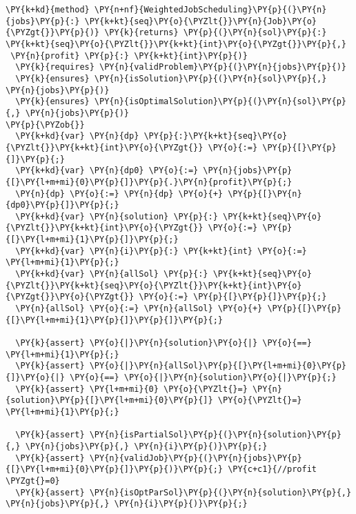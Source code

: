 \begin{Verbatim}[commandchars=\\\{\}, fontsize=\small]
\PY{k+kd}{method} \PY{n+nf}{WeightedJobScheduling}\PY{p}{(}\PY{n}{jobs}\PY{p}{:} \PY{k+kt}{seq}\PY{o}{\PYZlt{}}\PY{n}{Job}\PY{o}{\PYZgt{}}\PY{p}{)} \PY{k}{returns} \PY{p}{(}\PY{n}{sol}\PY{p}{:} \PY{k+kt}{seq}\PY{o}{\PYZlt{}}\PY{k+kt}{int}\PY{o}{\PYZgt{}}\PY{p}{,}
 \PY{n}{profit} \PY{p}{:} \PY{k+kt}{int}\PY{p}{)}
  \PY{k}{requires} \PY{n}{validProblem}\PY{p}{(}\PY{n}{jobs}\PY{p}{)}
  \PY{k}{ensures} \PY{n}{isSolution}\PY{p}{(}\PY{n}{sol}\PY{p}{,} \PY{n}{jobs}\PY{p}{)}
  \PY{k}{ensures} \PY{n}{isOptimalSolution}\PY{p}{(}\PY{n}{sol}\PY{p}{,} \PY{n}{jobs}\PY{p}{)}
\PY{p}{\PYZob{}}
  \PY{k+kd}{var} \PY{n}{dp} \PY{p}{:}\PY{k+kt}{seq}\PY{o}{\PYZlt{}}\PY{k+kt}{int}\PY{o}{\PYZgt{}} \PY{o}{:=} \PY{p}{[}\PY{p}{]}\PY{p}{;}
  \PY{k+kd}{var} \PY{n}{dp0} \PY{o}{:=} \PY{n}{jobs}\PY{p}{[}\PY{l+m+mi}{0}\PY{p}{]}\PY{p}{.}\PY{n}{profit}\PY{p}{;}
  \PY{n}{dp} \PY{o}{:=} \PY{n}{dp} \PY{o}{+} \PY{p}{[}\PY{n}{dp0}\PY{p}{]}\PY{p}{;}
  \PY{k+kd}{var} \PY{n}{solution} \PY{p}{:} \PY{k+kt}{seq}\PY{o}{\PYZlt{}}\PY{k+kt}{int}\PY{o}{\PYZgt{}} \PY{o}{:=} \PY{p}{[}\PY{l+m+mi}{1}\PY{p}{]}\PY{p}{;} 
  \PY{k+kd}{var} \PY{n}{i}\PY{p}{:} \PY{k+kt}{int} \PY{o}{:=} \PY{l+m+mi}{1}\PY{p}{;}
  \PY{k+kd}{var} \PY{n}{allSol} \PY{p}{:} \PY{k+kt}{seq}\PY{o}{\PYZlt{}}\PY{k+kt}{seq}\PY{o}{\PYZlt{}}\PY{k+kt}{int}\PY{o}{\PYZgt{}}\PY{o}{\PYZgt{}} \PY{o}{:=} \PY{p}{[}\PY{p}{]}\PY{p}{;} 
  \PY{n}{allSol} \PY{o}{:=} \PY{n}{allSol} \PY{o}{+} \PY{p}{[}\PY{p}{[}\PY{l+m+mi}{1}\PY{p}{]}\PY{p}{]}\PY{p}{;}

  \PY{k}{assert} \PY{o}{|}\PY{n}{solution}\PY{o}{|} \PY{o}{==} \PY{l+m+mi}{1}\PY{p}{;}
  \PY{k}{assert} \PY{o}{|}\PY{n}{allSol}\PY{p}{[}\PY{l+m+mi}{0}\PY{p}{]}\PY{o}{|} \PY{o}{==} \PY{o}{|}\PY{n}{solution}\PY{o}{|}\PY{p}{;}
  \PY{k}{assert} \PY{l+m+mi}{0} \PY{o}{\PYZlt{}=} \PY{n}{solution}\PY{p}{[}\PY{l+m+mi}{0}\PY{p}{]} \PY{o}{\PYZlt{}=} \PY{l+m+mi}{1}\PY{p}{;}

  \PY{k}{assert} \PY{n}{isPartialSol}\PY{p}{(}\PY{n}{solution}\PY{p}{,} \PY{n}{jobs}\PY{p}{,} \PY{n}{i}\PY{p}{)}\PY{p}{;}
  \PY{k}{assert} \PY{n}{validJob}\PY{p}{(}\PY{n}{jobs}\PY{p}{[}\PY{l+m+mi}{0}\PY{p}{]}\PY{p}{)}\PY{p}{;} \PY{c+c1}{//profit \PYZgt{}=0}
  \PY{k}{assert} \PY{n}{isOptParSol}\PY{p}{(}\PY{n}{solution}\PY{p}{,} \PY{n}{jobs}\PY{p}{,} \PY{n}{i}\PY{p}{)}\PY{p}{;}


\end{Verbatim}
